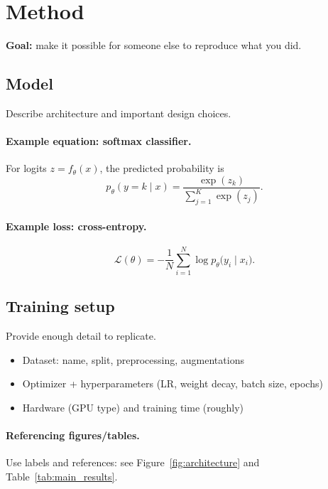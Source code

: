\documentclass{article}
\begin{document}
\section{Method}
\textbf{Goal:} make it possible for someone else to reproduce what you did.

\subsection{Model}
Describe architecture and important design choices.

\paragraph{Example equation: softmax classifier.}
For logits $z = f_\theta(x)$, the predicted probability is
\begin{equation}
p_\theta(y=k \mid x) = \frac{\exp(z_k)}{\sum_{j=1}^K \exp(z_j)}.
\end{equation}

\paragraph{Example loss: cross-entropy.}
\begin{equation}
\mathcal{L}(\theta) = -\frac{1}{N}\sum_{i=1}^{N}\log p_\theta\bigl(y_i \mid x_i\bigr).
\end{equation}

\subsection{Training setup}
Provide enough detail to replicate.
\begin{itemize}
  \item Dataset: name, split, preprocessing, augmentations
  \item Optimizer + hyperparameters (LR, weight decay, batch size, epochs)
  \item Hardware (GPU type) and training time (roughly)
\end{itemize}

\paragraph{Referencing figures/tables.}
Use labels and references: see Figure~\ref{fig:architecture} and Table~\ref{tab:main_results}.
\end{document}

